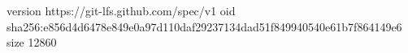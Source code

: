 version https://git-lfs.github.com/spec/v1
oid sha256:e856d4d6478e849e0a97d110daf29237134dad51f849940540e61b7f864149e6
size 12860
